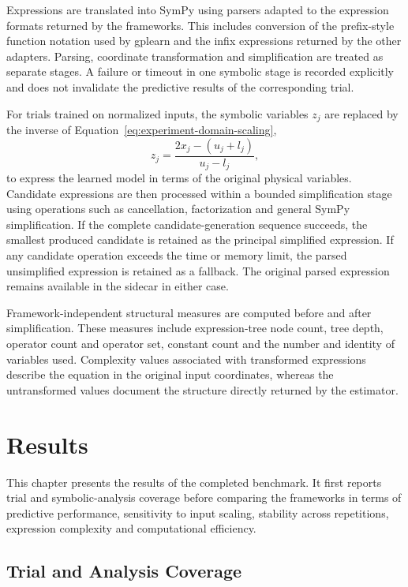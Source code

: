 \documentclass[12pt,oneside,bibtotoc,liststotoc]{scrbook}
\begin{document}
Expressions are translated into SymPy using parsers adapted to the expression formats returned by the frameworks. This includes conversion of the prefix-style function notation used by gplearn and the infix expressions returned by the other adapters. Parsing, coordinate transformation and simplification are treated as separate stages. A failure or timeout in one symbolic stage is recorded explicitly and does not invalidate the predictive results of the corresponding trial.

For trials trained on normalized inputs, the symbolic variables $z_j$ are replaced by the inverse of Equation~\ref{eq:experiment-domain-scaling},
\begin{equation}
    z_j = \frac{2x_j-(u_j+l_j)}{u_j-l_j},
\end{equation}
to express the learned model in terms of the original physical variables. Candidate expressions are then processed within a bounded simplification stage using operations such as cancellation, factorization and general SymPy simplification. If the complete candidate-generation sequence succeeds, the smallest produced candidate is retained as the principal simplified expression. If any candidate operation exceeds the time or memory limit, the parsed unsimplified expression is retained as a fallback. The original parsed expression remains available in the sidecar in either case.

Framework-independent structural measures are computed before and after simplification. These measures include expression-tree node count, tree depth, operator count and operator set, constant count and the number and identity of variables used. Complexity values associated with transformed expressions describe the equation in the original input coordinates, whereas the untransformed values document the structure directly returned by the estimator.


\chapter{Results}

This chapter presents the results of the completed benchmark. It first reports trial and symbolic-analysis coverage before comparing the frameworks in terms of predictive performance, sensitivity to input scaling, stability across repetitions, expression complexity and computational efficiency.

\section{Trial and Analysis Coverage}
\end{document}
